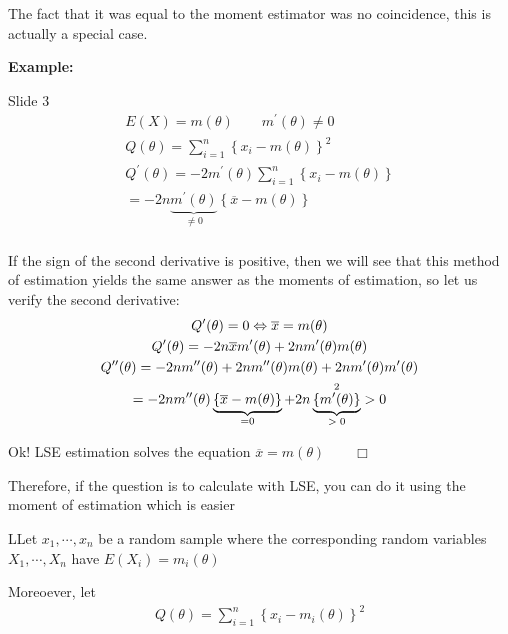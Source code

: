 \noindent The fact that it was equal to the moment estimator was no coincidence, this is actually a special case.
\par\bigskip
\noindent\textbf{Example:}\par
Slide 3
\begin{equation*}
  \begin{gathered}
    E(X) = m(\theta)\qquad m^{\prime}(\theta)\neq0\\
  Q(\theta) = \sum_{i=1}^{n}\left\{x_i-m(\theta)\right\}^2\\
  Q^{\prime}(\theta) = -2m^{\prime}(\theta)\sum_{i=1}^{n}\left\{x_i-m(\theta)\right\}\\
  = -2n\underbrace{m^{\prime}(\theta)}_{\text{$\neq0$}}\left\{\overline{x}-m(\theta)\right\}\\
  \end{gathered}
\end{equation*}\par
\noindent If the sign of the second derivative is positive, then we will see that this method of estimation yields the same answer as the moments of estimation, so let us verify the second derivative:
\begin{equation*}
  \begin{gathered}
    Q^{\prime}(\theta) =0\Leftrightarrow \overline{x} = m(\theta)\\
    Q^{\prime}(\theta) = -2n\overline{x}m^{\prime}(\theta)+2nm^{\prime}(\theta)m(\theta)\\
    Q^{\prime\prime}(\theta) = -2nm^{\prime\prime}(\theta)+2nm^{\prime\prime}(\theta)m(\theta)+2nm^{\prime}(\theta)m^{\prime}(\theta)\\
    = -2nm^{\prime\prime}(\theta)\underbrace{\left\{\overline{x}-m(\theta)\right\}}_{\text{=0}} + 2n\underbrace{\left\{m^{\prime}(\theta)\right\}}_{\text{$>0$}}^2>0
  \end{gathered}
\end{equation*}\par
\noindent Ok! LSE estimation solves the equation $\overline{x} = m(\theta)\qquad\Box$
\par\bigskip
\noindent Therefore, if the question is to calculate with LSE, you can do it using the moment of estimation which is easier
\par\bigskip
\begin{theo}
  LLet $x_1,\cdots,x_n$ be a random sample where the corresponding random variables $X_1,\cdots,X_n$ have $E(X_i) = m_i(\theta)$
  \par\bigskip
  \noindent Moreoever, let
  \begin{equation*}
    \begin{gathered}
    Q(\theta) = \sum_{i=1}^{n}\left\{x_i-m_i(\theta)\right\}^2
    \end{gathered}
  \end{equation*}
  \par\bigskip
\end{theo}
